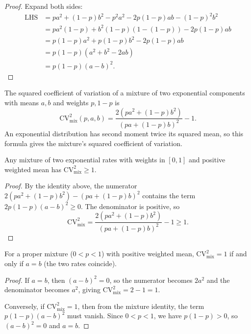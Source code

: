\begin{proof}
Expand both sides:
\begin{align}
\text{LHS} &= pa^2 + (1-p)b^2 - p^2a^2 - 2p(1-p)ab - (1-p)^2b^2\\
&= pa^2(1 - p) + b^2(1-p)(1 - (1-p)) - 2p(1-p)ab\\
&= p(1-p)a^2 + p(1-p)b^2 - 2p(1-p)ab\\
&= p(1-p)(a^2 + b^2 - 2ab)\\
&= p(1-p)(a-b)^2.
\end{align}
\end{proof}

\begin{definition}
The squared coefficient of variation of a mixture of two exponential components with means $a, b$ and weights $p, 1-p$ is
\[ \mathrm{CV}^2_{\mathrm{mix}}(p, a, b) = \frac{2(pa^2 + (1-p)b^2)}{(pa + (1-p)b)^2} - 1. \]
An exponential distribution has second moment twice its squared mean, so this formula gives the mixture's squared coefficient of variation.
\end{definition}

\begin{theorem}
Any mixture of two exponential rates with weights in $[0,1]$ and positive weighted mean has $\mathrm{CV}^2_{\mathrm{mix}} \geq 1$.
\end{theorem}

\begin{proof}
By the identity above, the numerator $2(pa^2 + (1-p)b^2) - (pa + (1-p)b)^2$ contains the term $2p(1-p)(a-b)^2 \geq 0$. The denominator is positive, so
\[ \mathrm{CV}^2_{\mathrm{mix}} = \frac{2(pa^2 + (1-p)b^2)}{(pa+(1-p)b)^2} - 1 \geq 1. \]
\end{proof}

\begin{theorem}
For a proper mixture ($0 < p < 1$) with positive weighted mean, $\mathrm{CV}^2_{\mathrm{mix}} = 1$ if and only if $a = b$ (the two rates coincide).
\end{theorem}

\begin{proof}
If $a = b$, then $(a-b)^2 = 0$, so the numerator becomes $2a^2$ and the denominator becomes $a^2$, giving $\mathrm{CV}^2_{\mathrm{mix}} = 2 - 1 = 1$.

Conversely, if $\mathrm{CV}^2_{\mathrm{mix}} = 1$, then from the mixture identity, the term $p(1-p)(a-b)^2$ must vanish. Since $0 < p < 1$, we have $p(1-p) > 0$, so $(a-b)^2 = 0$ and $a = b$.
\end{proof}


